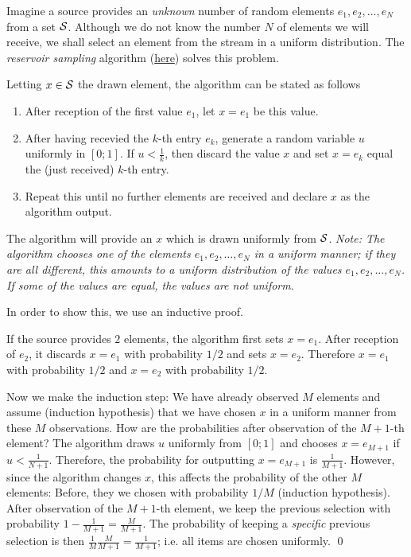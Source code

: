 
Imagine a source provides an \emph{unknown} number of random elements $e_1, e_2, \ldots, e_N$ from a set $\mathcal{S}$. Although we do not know the number $N$ of elements we will receive, we shall select an element from the stream in a uniform distribution. The \emph{reservoir sampling} algorithm (\href{https://math.stackexchange.com/questions/1058500/can-you-select-random-entry-from-unknown-number-of-entries}{here}) solves this problem.

Letting $x \in \mathcal{S}$ the drawn element, the algorithm can be stated as follows

\begin{enumerate}
  \item After reception of the first value $e_1$, let $x = e_1$ be this value.

  \item After having recevied the $k$-th entry $e_k$, generate a random variable $u$ uniformly in $[0;1]$. If $u < \frac{1}{k}$, then discard the value $x$ and set $x = e_k$ equal the (just received) $k$-th entry.

  \item Repeat this until no further elements are received and declare $x$ as the algorithm output.

\end{enumerate}

The algorithm will provide an $x$ which is drawn uniformly from $\mathcal{S}$. \emph{Note: The algorithm chooses one of the elements $e_1, e_2, \ldots, e_N$ in a uniform manner; if they are all different, this amounts to a uniform distribution of the values $e_1, e_2, \ldots, e_N$. If some of the values are equal, the values are not uniform}.


In order to show this, we use an inductive proof.

If the source provides $2$ elements, the algorithm first sets $x = e_1$. After reception of $e_2$, it discards $x=e_1$ with probability $1/2$ and sets $x=e_2$. Therefore $x=e_1$ with probability $1/2$ and $x = e_2$ with probability $1/2$.

Now we make the induction step: We have already observed $M$ elements and assume (induction hypothesis) that we have chosen $x$ in a uniform manner from these $M$ observations. How are the probabilities after observation of the $M+1$-th element? The algorithm draws $u$ uniformly from $[0;1]$ and chooses $x=e_{M+1}$ if $u < \frac{1}{N+1}$. Therefore, the probability for outputting $x=e_{M+1}$ is $\frac{1}{M+1}$. However, since the algorithm changes $x$, this affects the probability of the other $M$ elements: Before, they we chosen with probability $1/M$ (induction hypothesis). After observation of the $M+1$-th element, we keep the previous selection with probability $1 - \frac{1}{M+1} = \frac{M}{M+1}$. The probability of keeping a \emph{specific} previous selection is then $\frac{1}{M} \frac{M}{M+1} = \frac{1}{M+1}$; i.e. all items are chosen uniformly. \qed

